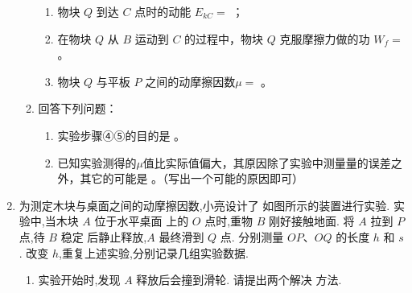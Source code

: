 \begin{enumerate}
\begin{enumerate}
\begin{enumerate}
\item 
物块 $ Q $ 到达 $ C $ 点时的动能 $ E_{kC} = $
；

\item 
在物块 $ Q $ 从 $ B $ 运动到 $ C $ 的过程中，物块 $ Q $ 克服摩擦力做的功 $ W_f= $  。

\item 
物块 $ Q $ 与平板 $ P $ 之间的动摩擦因数$ \mu = $ 。 




\end{enumerate}



\item 
回答下列问题：

\begin{enumerate}
\renewcommand{\labelenumiii}{\roman{enumiii}.}
\item
实验步骤④⑤的目的是
。

\item 
已知实验测得的$ \mu $值比实际值偏大，其原因除了实验中测量量的误差之外，其它的可能是  
。（写出一个可能的原因即可）


\end{enumerate}



\end{enumerate}



\newpage
\item 
{}
为测定木块与桌面之间的动摩擦因数,小亮设计了
如图所示的装置进行实验. 实验中,当木块 $ A $ 位于水平桌面
上的 $ O $ 点时,重物 $ B $ 刚好接触地面. 将 $ A $ 拉到 $ P $ 点,待 $ B $ 稳定
后静止释放,$ A $ 最终滑到 $ Q $ 点. 分别测量 $ OP $、$ OQ $ 的长度 $ h $
和 $ s $. 改变 $ h $,重复上述实验,分别记录几组实验数据.
\begin{figure}[h!]
\centering

\end{figure}

\begin{enumerate}
\renewcommand{\labelenumi}{\arabic{enumi}.}
\item
实验开始时,发现 $ A $ 释放后会撞到滑轮. 请提出两个解决
方法.


\end{enumerate}
\end{enumerate}
